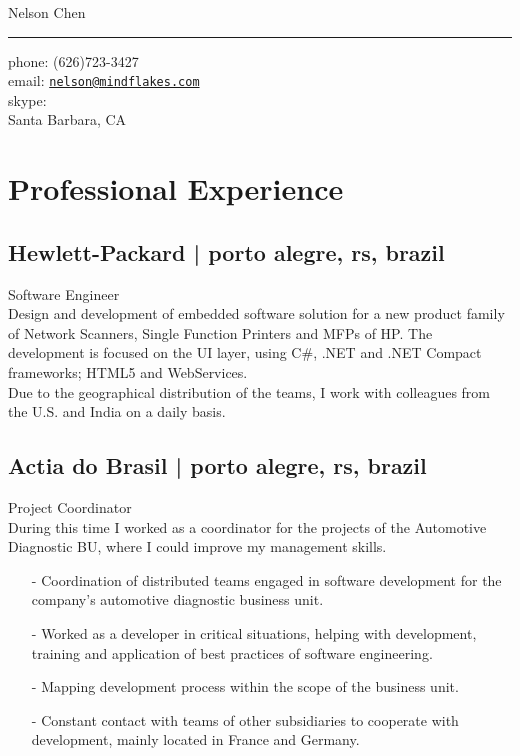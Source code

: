 \documentclass[10pt,a4paper]{article}
\makeatletter
\def\myname{Nelson Chen}
\def\myemail{nelson@mindflakes.com}
\def\mycellphone{(626)723-3427}
\def\myaddress{Santa Barbara, CA}
\newcommand{\years}[1]{\marginnote{#1}}
\makeatother
\begin{document}
{\LARGE \myname}\\
\hrule
\vspace{0.2in}
{\large phone: \mycellphone}\\[.05cm]
{\large email: \href{mailto:\myemail}{\texttt{\myemail}}}\\[.05cm]
{\large skype: \myskype}\\[.2cm]
\myaddress
\vspace{0.5in}

\section*{Professional Experience}

\subsection*{Hewlett-Packard | {\footnotesize{porto alegre, rs, brazil}}}

\years{2010- \ldots}Software Engineer\\
Design and development of embedded software solution for a new product family of Network Scanners, Single Function Printers and MFPs of HP. The development is focused on the UI layer, using C\#, .NET and .NET Compact frameworks; HTML5 and WebServices.\\
Due to the geographical distribution of the teams, I work with colleagues from the U.S. and India on a daily basis.

\subsection*{Actia do Brasil | {\footnotesize{porto alegre, rs, brazil}}}

\years{2007-2010}Project Coordinator\\
During this time I worked as a coordinator for the projects of the Automotive Diagnostic BU, where I could improve my management skills.
\begin{itemize}
\item[-] Coordination of distributed teams engaged in software development for the company's automotive diagnostic business unit.
\item[-] Worked as a developer in critical situations, helping with development, training and application of best practices of software engineering.
\item[-] Mapping development process within the scope of the business unit.
\item[-] Constant contact with teams of other subsidiaries to cooperate with development, mainly located in France and Germany.
\end{itemize}
\end{document}
